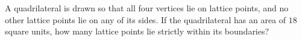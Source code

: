 A quadrilateral is drawn so that all four vertices lie on lattice points, and no other lattice points lie on any of its sides. If the quadrilateral has an area of $18$ square units, how many lattice points lie strictly within its boundaries?

